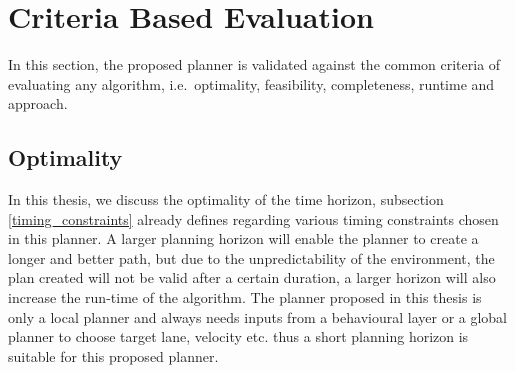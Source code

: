 

\section{Criteria Based Evaluation}
\label{criteria_based_eval}
In this section, the proposed planner is validated against the common criteria of evaluating any algorithm, i.e.\ optimality, feasibility, completeness, runtime and approach.

\subsection{Optimality}
 In this thesis, we discuss the optimality of the time horizon, subsection \ref{timing_constraints} already defines regarding various timing constraints chosen in this planner. A larger planning horizon will enable the planner to create a longer and better path, but due to the unpredictability of the environment, the plan created will not be valid after a certain duration, a larger horizon will also increase the run-time of the algorithm. The planner proposed in this thesis is only a local planner and always needs inputs from a behavioural layer or a global planner to choose target lane, velocity etc. thus a short planning horizon is suitable for this proposed planner. 

